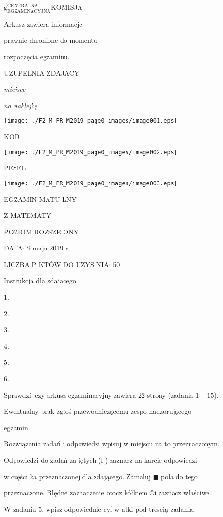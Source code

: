 \documentclass[a4paper,12pt]{article}
\begin{document}
$\mathrm{g}_{\mathrm{E}\mathrm{G}\mathrm{Z}\mathrm{A}\mathrm{M}\mathrm{I}\mathrm{N}\mathrm{A}\mathrm{C}\mathrm{Y}\mathrm{J}\mathrm{N}\mathrm{A}}^{\mathrm{C}\mathrm{E}\mathrm{N}\mathrm{T}\mathrm{R}\mathrm{A}\mathrm{L}\mathrm{N}\mathrm{A}}$KOMISJA

Arkusz zawiera informacje

prawnie chronione do momentu

rozpoczęcia egzaminu.

UZUPELNIA ZDAJACY

{\it miejsce}

{\it na naklejkę}
\begin{center}
\texttt{[image: ./F2\_M\_PR\_M2019\_page0\_images/image001.eps]}
\end{center}
KOD
\begin{center}
\texttt{[image: ./F2\_M\_PR\_M2019\_page0\_images/image002.eps]}
\end{center}
PESEL
\begin{center}
\texttt{[image: ./F2\_M\_PR\_M2019\_page0\_images/image003.eps]}
\end{center}
EGZAMIN MATU  LNY

Z MATEMATY

POZIOM ROZSZE ONY

DATA: 9 maja 2019 r.

LICZBA P KTÓW DO UZYS NIA: 50

Instrukcja dla zdającego

1.

2.

3.

4.

5.

6.

Sprawdzí, czy arkusz egzaminacyjny zawiera 22 strony (zadania $1-15$).

Ewentualny brak zgłoś przewodniczącemu zespo nadzorującego

egzamin.

Rozwiązania zadań i odpowiedzi wpisuj w miejscu na to przeznaczonym.

Odpowiedzi do zadań za iętych (l ) zaznacz na karcie odpowiedzi

w części ka przeznaczonej dla zdającego. Zamaluj $\blacksquare$ pola do tego

przeznaczone. Błędne zaznaczenie otocz kółkiem \copyright i zaznacz właściwe.

$\mathrm{W}$ zadaniu 5. wpisz odpowiednie cyf w atki pod treścią zadania.
\end{document}

